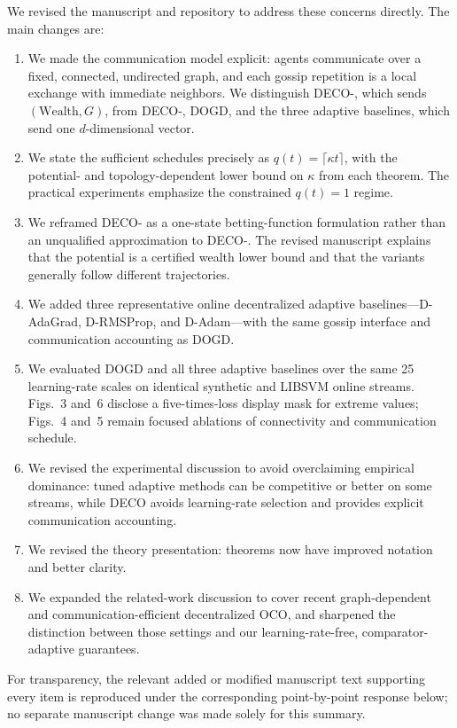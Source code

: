 \documentclass[12pt,english]{reviewresponse}
\newcommand{\algname}{{DECO}\xspace}
\begin{document}
\begin{revresponse}
    We revised the manuscript and repository to address these concerns directly.
    The main changes are:
    \begin{enumerate}
        \item We made the communication model explicit: agents communicate over a fixed, connected, undirected graph, and each gossip repetition is a local exchange with immediate neighbors.  We distinguish \algname{}-, which sends $(\mathrm{Wealth},G)$, from \algname{}-, DOGD, and the three adaptive baselines, which send one $d$-dimensional vector.
        \item We state the sufficient schedules precisely as $q(t)=\lceil\kappa t\rceil$, with the potential- and topology-dependent lower bound on $\kappa$ from each theorem.  The practical experiments emphasize the constrained $q(t)=1$ regime.
        \item We reframed \algname{}- as a one-state betting-function formulation rather than an unqualified approximation to \algname{}-.  The revised manuscript explains that the potential is a certified wealth lower bound and that the variants generally follow different trajectories.
        \item We added three representative online decentralized adaptive baselines---D-AdaGrad, D-RMSProp, and D-Adam---with the same gossip interface and communication accounting as DOGD\@.
        \item We evaluated DOGD and all three adaptive baselines over the same 25 learning-rate scales on identical synthetic and LIBSVM online streams. Figs.~3 and~6 disclose a five-times-loss display mask for extreme values; Figs.~4 and~5 remain focused ablations of connectivity and communication schedule.
        \item We revised the experimental discussion to avoid overclaiming empirical dominance: tuned adaptive methods can be competitive or better on some streams, while \algname{} avoids learning-rate selection and provides explicit communication accounting.
        \item We revised the theory presentation: theorems now have improved notation and better clarity.
        \item We expanded the related-work discussion to cover recent graph-dependent and communication-efficient decentralized OCO, and sharpened the distinction between those settings and our learning-rate-free, comparator-adaptive guarantees.
    \end{enumerate}
    For transparency, the relevant added or modified manuscript text supporting every item is reproduced under the corresponding point-by-point response below; no separate manuscript change was made solely for this summary.
\end{revresponse}
\end{document}

